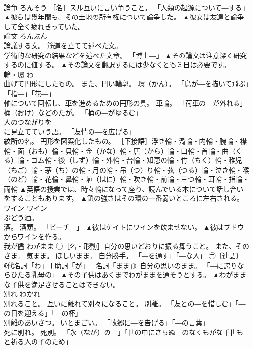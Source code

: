 \documentclass[8pt]{extreport}
\begin{document}
\begin{CJK}{UTF8}{min}
\\	論争	ろんそう	［名］スル互いに言い争うこと。 「人類の起源について―する」	▲彼らは幾年間も、その土地の所有権について論争した。 ▲彼女は友達と論争して全く疲れきっていた。
\\	論文	ろんぶん	
\\	論議する文。 筋道を立てて述べた文。 
\\	学術的な研究の結果などを述べた文章。 「博士―」	▲その論文は注意深く研究するのに値する。 ▲その論文を翻訳するには少なくとも３日は必要です。
\\	輪・環	わ	
\\	曲げて円形にしたもの。 また、円い輪郭。 環（かん）。 「鳥が―を描いて飛ぶ」「指―」「花―」 
\\	軸について回転し、車を進めるための円形の具。 車輪。 「荷車の―が外れる」 
\\	桶（おけ）などのたが。 「桶の―がゆるむ」 
\\	人のつながりを 
\\	に見立てていう語。 「友情の―を広げる」 
\\	紋所の名。 円形を図案化したもの。 ［下接語］浮き輪・渦輪・内輪・腕輪・襟輪・面（おも）輪・貝輪・金（かな）輪・唐（から）輪・口輪・首輪・曲（くる）輪・ゴム輪・後（しず）輪・外輪・台輪・知恵の輪・竹（ちく）輪・稚児（ちご）輪・茅（ち）の輪・月の輪・吊（つ）り輪・弦（つる）輪・泣き輪・喉（のど）輪・花輪・鼻輪・埴（はに）輪・吹き輪・前輪・三つ輪・耳輪・指輪・両輪	▲英語の授業では、時々輪になって座り、読んでいる本について話し合いをすることもあります。 ▲鎖の強さはその環の一番弱いところに左右される。
\\	ワイン	ワイン	
\\	ぶどう酒。 
\\	酒。 酒類。 「ピーチ―」	▲彼はケイトにワインを飲ませない。 ▲彼はブドウからワインを作る。
\\	我が儘	わがまま	㊀［名・形動］自分の思いどおりに振る舞うこと。 また、そのさま。 気まま。 ほしいまま。 自分勝手。 「―を通す」「―な人」 ㊁〔連語〕《代名詞「わ」＋助詞「が」＋名詞「まま」》自分の思いのまま。 「―に誇りならひたる乳母の」	▲その子供はあくまでわがままを通そうとする。 ▲わがままな子供を満足させることはできない。
\\	別れ	わかれ	
\\	別れること。 互いに離れて別々になること。 別離。 「友との―を惜しむ」「―の日を迎える」「―の杯」 
\\	別離のあいさつ。 いとまごい。 「故郷に―を告げる」「―の言葉」 
\\	死に別れ。 死別。 「永（なが）の―」「世の中にさらぬ―のなくもがな千世もと祈る人の子のため」 

\end{CJK}
\end{document}

